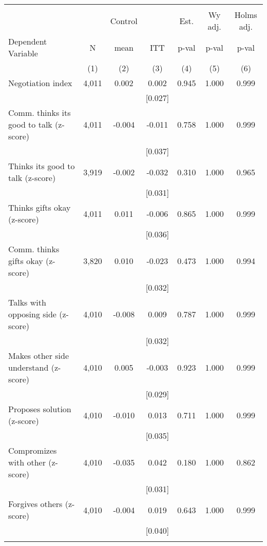 \begin{tabular}{lcccccc}
\hline \noalign{\smallskip} &  &  &  &  &  & \\
 &  & Control &  & Est. & Wy adj. & Holms adj.\\
Dependent Variable & N & mean & ITT & p-val & p-val & p-val\\
 & (1) & (2) & (3) & (4) & (5) & (6)\\
\noalign{\smallskip}\hline \noalign{\smallskip}Negotiation index & 4,011 & 0.002 & 0.002 & 0.945 & 1.000 & 0.999\\
 &  &  & [0.027] &  &  & \\
\quad Comm. thinks its good to talk (z-score) & 4,011 & -0.004 & -0.011 & 0.758 & 1.000 & 0.999\\
 &  &  & [0.037] &  &  & \\
\quad Thinks its good to talk (z-score) & 3,919 & -0.002 & -0.032 & 0.310 & 1.000 & 0.965\\
 &  &  & [0.031] &  &  & \\
\quad Thinks gifts okay (z-score) & 4,011 & 0.011 & -0.006 & 0.865 & 1.000 & 0.999\\
 &  &  & [0.036] &  &  & \\
\quad Comm. thinks gifts okay (z-score) & 3,820 & 0.010 & -0.023 & 0.473 & 1.000 & 0.994\\
 &  &  & [0.032] &  &  & \\
\quad Talks with opposing side (z-score) & 4,010 & -0.008 & 0.009 & 0.787 & 1.000 & 0.999\\
 &  &  & [0.032] &  &  & \\
\quad Makes other side understand (z-score) & 4,010 & 0.005 & -0.003 & 0.923 & 1.000 & 0.999\\
 &  &  & [0.029] &  &  & \\
\quad Proposes solution (z-score) & 4,010 & -0.010 & 0.013 & 0.711 & 1.000 & 0.999\\
 &  &  & [0.035] &  &  & \\
\quad Compromizes with other (z-score) & 4,010 & -0.035 & 0.042 & 0.180 & 1.000 & 0.862\\
 &  &  & [0.031] &  &  & \\
\quad Forgives others (z-score) & 4,010 & -0.004 & 0.019 & 0.643 & 1.000 & 0.999\\
 &  &  & [0.040] &  &  & \\
\noalign{\smallskip}\hline\end{tabular}
